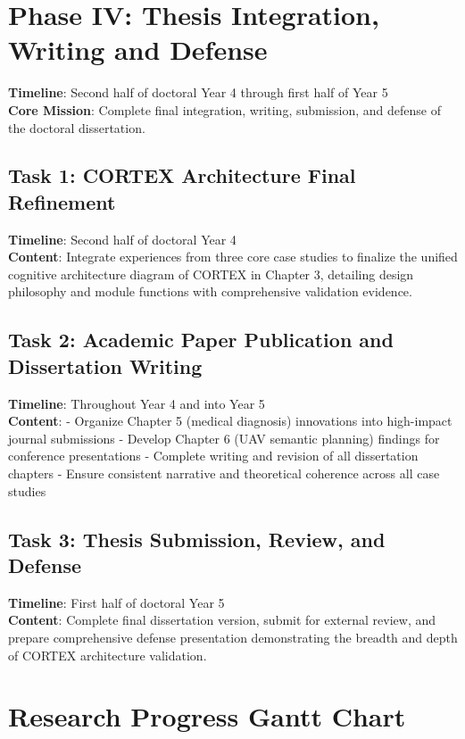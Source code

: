 \section{Phase IV: Thesis Integration, Writing and Defense}

\textbf{Timeline}: Second half of doctoral Year 4 through first half of Year 5\\
\textbf{Core Mission}: Complete final integration, writing, submission, and defense of the doctoral dissertation.

\subsection{Task 1: CORTEX Architecture Final Refinement}

\textbf{Timeline}: Second half of doctoral Year 4\\
\textbf{Content}: Integrate experiences from three core case studies to finalize the unified cognitive architecture diagram of CORTEX in Chapter 3, detailing design philosophy and module functions with comprehensive validation evidence.

\subsection{Task 2: Academic Paper Publication and Dissertation Writing}

\textbf{Timeline}: Throughout Year 4 and into Year 5\\
\textbf{Content}: 
- Organize Chapter 5 (medical diagnosis) innovations into high-impact journal submissions
- Develop Chapter 6 (UAV semantic planning) findings for conference presentations
- Complete writing and revision of all dissertation chapters
- Ensure consistent narrative and theoretical coherence across all case studies

\subsection{Task 3: Thesis Submission, Review, and Defense}

\textbf{Timeline}: First half of doctoral Year 5\\
\textbf{Content}: Complete final dissertation version, submit for external review, and prepare comprehensive defense presentation demonstrating the breadth and depth of CORTEX architecture validation.

\section{Research Progress Gantt Chart}

